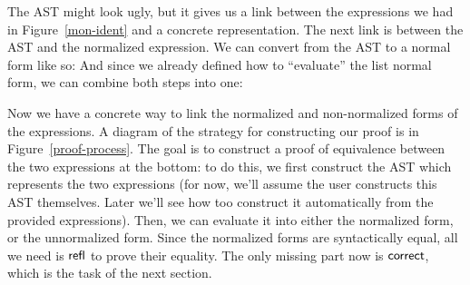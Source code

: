 \documentclass[draft, twocolumn]{article}
\theoremstyle{definition}
\theoremstyle{remark}
\begin{document}
The AST might look ugly, but it gives us a link between the expressions we had
in Figure~\ref{mon-ident} and a concrete representation. The next link is
between the AST and the normalized expression. We can convert from the AST to a
normal form like so:
And since we already defined how to ``evaluate'' the list normal form, we can
combine both steps into one:

Now we have a concrete way to link the normalized and non-normalized forms of
the expressions. A diagram of the strategy for constructing our proof is in
Figure~\ref{proof-process}. The goal is to construct a proof of equivalence
between the two expressions at the bottom: to do this, we first construct the
AST which represents the two expressions (for now, we'll assume the user
constructs this AST themselves. Later we'll see how too construct it
automatically from the provided expressions). Then, we can evaluate it into
either the normalized form, or the unnormalized form. Since the normalized forms
are syntactically equal, all we need is \(\AgdaInductiveConstructor{refl}\) to
prove their equality. The only missing part now is \(\AgdaFunction{correct}\),
which is the task of the next section.
\end{document}
